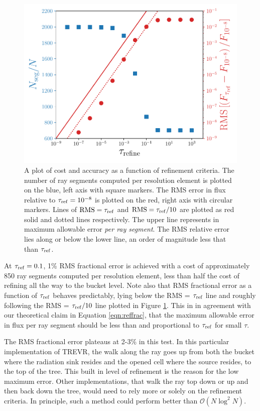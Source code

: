\documentclass[fleq,usenatbib]{mnras}
\newcommand{\acro}{TREVR}
\newcommand{\bigO}[1]{\mathcal{O}\left(#1\right)}
\newcommand{\tr}{\tau_{\rm ref}}
\begin{document}
\begin{figure}
\includegraphics[width=1\linewidth]{Figures/refinement_criteria.pdf}
\caption{A plot of cost and accuracy as a function of refinement criteria. The 
number of ray segments computed per resolution element is plotted on the blue,
left axis with square markers. The RMS error in flux relative to $\tr
=10^{-8}$ is plotted on the red, right axis with circular markers. Lines of 
${\rm RMS} = \tr$ and ${\rm RMS} = \tr/10$ are plotted as red solid and dotted 
lines respectively. The upper line represents in maximum allowable error 
\textit{per ray segment}. The RMS relative error lies along or below the lower 
line, an order of magnitude less that than $\tr$.}
\label{fig:refcrit}
\end{figure}

At $\tr=0.1$, 1\% RMS fractional error is achieved with a cost of 
approximately 850 ray segments computed per resolution element, less than half 
the cost of refining all the way to the bucket level. Note also that RMS 
fractional error as a function of $\tr$ behaves predictably, lying below the 
RMS = $\tr$ line and roughly following the RMS = $\tr/10$ line plotted in 
Figure \ref{fig:refcrit}. This in in agreement with our theoretical claim in 
Equation \ref{eqn:reffrac}, that the maximum allowable error in flux per ray 
segment should be less than and proportional to $\tr$ for small $\tau$. 

The RMS fractional error plateaus at 2-3\% in this test. In this particular 
implementation of \acro{}, the walk along the ray goes up from both the bucket 
where the radiation sink resides and the opened cell where the source resides, 
to the top of the tree. This built in level of refinement is the reason for 
the low maximum error. Other implementations, that walk the ray top down or up 
and then back down the tree, would need to rely more or solely on the 
refinement criteria. In principle, such a method could perform better than 
$\bigO{N\log^2 N}$.
\end{document}
